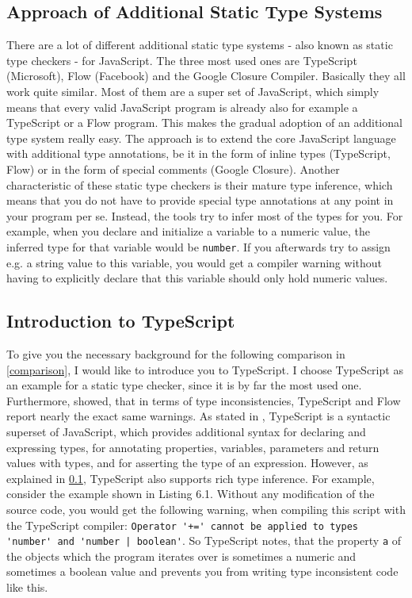 \documentclass[runningheads,a4paper]{llncs}
\begin{document}
\subsection{Approach of Additional Static Type Systems} \label{staticTypeSystems}

There are a lot of different additional static type systems - also known as static type checkers - for JavaScript.
The three most used ones are TypeScript (Microsoft), Flow (Facebook) and the Google Closure Compiler.
Basically they all work quite similar.
Most of them are a super set of JavaScript, which simply means that every valid JavaScript program is already also for example a TypeScript or a Flow program.
This makes the gradual adoption of an additional type system really easy.
The approach is to extend the core JavaScript language with additional type annotations, be it in the form of inline types (TypeScript, Flow) or in the form of special comments (Google Closure).
Another characteristic of these static type checkers is their mature type inference, which means that you do not have to provide special type annotations at any point in your program per se.
Instead, the tools try to infer most of the types for you. 
For example, when you declare and initialize a variable to a numeric value, the inferred type for that variable would be \lstinline[columns=fixed]{number}.
If you afterwards try to assign e.g. a string value to this variable, you would get a compiler warning without having to explicitly declare that this variable should only hold numeric values.


\subsection{Introduction to TypeScript}

To give you the necessary background for the following comparison in \ref{comparison}, I would like to introduce you to TypeScript.
I choose TypeScript as an example for a static type checker, since it is by far the most used one.
Furthermore, \cite{DBLP:conf/icse/GaoBB17} showed, that in terms of type inconsistencies, TypeScript and Flow report nearly the exact same warnings.
As stated in \cite{DBLP:conf/ecoop/BiermanAT14}, TypeScript is a syntactic superset of JavaScript, which provides additional syntax for declaring and expressing types, for annotating properties, variables, parameters and return values with types, and for asserting the type of an expression.
However, as explained in \ref{staticTypeSystems}, TypeScript also supports rich type inference.
For example, consider the example shown in Listing 6.1.
Without any modification of the source code, you would get the following warning, when compiling this script with the TypeScript compiler:
\lstinline[columns=fixed]{Operator '+=' cannot be applied to types 'number' and 'number | boolean'}.
So TypeScript notes, that the property \lstinline[columns=fixed]{a} of the objects which the program iterates over is sometimes a numeric and sometimes a boolean value and prevents you from writing type inconsistent code like this.
\end{document}
